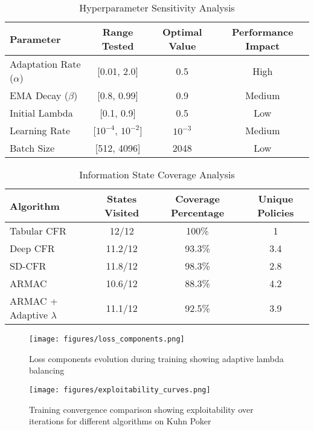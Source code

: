 \documentclass{icml2024}
\begin{document}
\begin{table}[h]
\centering
\caption{Hyperparameter Sensitivity Analysis}
\label{tab:hyperparameter_sensitivity}
\begin{tabular}{lccc}
\toprule
\textbf{Parameter} & \textbf{Range Tested} & \textbf{Optimal Value} & \textbf{Performance Impact} \\
\midrule
Adaptation Rate ($\alpha$) & [0.01, 2.0] & 0.5 & High \\
EMA Decay ($\beta$) & [0.8, 0.99] & 0.9 & Medium \\
Initial Lambda & [0.1, 0.9] & 0.5 & Low \\
Learning Rate & [$10^{-4}$, $10^{-2}$] & $10^{-3}$ & Medium \\
Batch Size & [512, 4096] & 2048 & Low \\
\bottomrule
\end{tabular}
\end{table}

\begin{table}[h]
\centering
\caption{Information State Coverage Analysis}
\label{tab:coverage_analysis}
\begin{tabular}{lccc}
\toprule
\textbf{Algorithm} & \textbf{States Visited} & \textbf{Coverage Percentage} & \textbf{Unique Policies} \\
\midrule
Tabular CFR & 12/12 & 100\% & 1 \\
Deep CFR & 11.2/12 & 93.3\% & 3.4 \\
SD-CFR & 11.8/12 & 98.3\% & 2.8 \\
ARMAC & 10.6/12 & 88.3\% & 4.2 \\
ARMAC + Adaptive $\lambda$ & 11.1/12 & 92.5\% & 3.9 \\
\bottomrule
\end{tabular}
\end{table}

\begin{figure}[h]
\centering
\texttt{[image: figures/loss\_components.png]}
\caption{Loss components evolution during training showing adaptive lambda balancing}
\label{fig:loss_components}
\end{figure}

\begin{figure}[h]
\centering
\texttt{[image: figures/exploitability\_curves.png]}
\caption{Training convergence comparison showing exploitability over iterations for different algorithms on Kuhn Poker}
\label{fig:convergence}
\end{figure}
\end{document}
